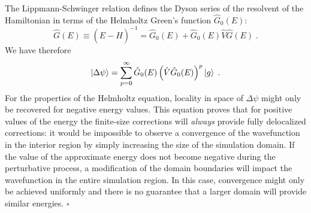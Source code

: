 \documentclass[a4paper]{article}
\newcommand{\be}{\begin{equation}}
\newcommand{\ee}{\end{equation}}
\newcommand{\op}[1]{\hat {#1}}
\begin{document}
The Lippmann-Schwinger relation defines the Dyson series of the resolvent of the Hamiltonian in terms of the Helmholtz Green's function $\op G_0(E)$:
\be 
\op G(E) \equiv (E- \op H)^{-1} = \op G_0(E) + \op G_0(E) \op V \op G(E)\;.
\ee
We have therefore 
\be 
\ket{\Delta \psi} = 
\sum_{p=0}^\infty \op G_0(E) 
\left(\op V \op G_0(E)\right)^p \ket{g}\;.
\ee
For the properties of the Helmholtz equation, locality in space of $\Delta \psi$ might only be recovered for negative energy values. This equation proves that for positive values of the energy the finite-size corrections will \emph{always} provide fully delocalized corrections: it would be impossible to observe a convergence of the wavefunction in the interior region by simply increasing the size of the simulation domain. 
If the value of the approximate energy does not become negative during the perturbative process, 
a modification of the domain boundaries will impact the wavefunction in the entire simulation region. In this case, convergence might only be achieved uniformly and there is no guarantee that a larger domain will provide similar energies.
$\square$
\end{document}

